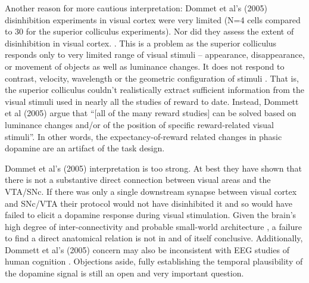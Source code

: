 {    Another reason for more cautious interpretation: Dommet et al's (2005) disinhibition experiments in visual cortex were very limited (N=4 cells compared to 30 for the superior colliculus experiments).  Nor did they assess the extent of disinhibition in visual cortex.
}. This is a problem as the superior colliculus responds only to very limited range of visual stimuli -- appearance, disappearance, or movement of objects as well as luminance changes.  It does not respond to contrast, velocity, wavelength or the geometric configuration of stimuli \citep{Dommett:2005p7263}. That is, the superior colliculus couldn't realistically extract sufficient information from the visual stimuli used in nearly all the studies of reward to date.  Instead, Dommett et al (2005) argue that ``[all of the many reward studies] can be solved based on luminance changes and/or of the position of specific reward-related visual stimuli''.  In other words, the expectancy-of-reward related changes in phasic dopamine are an artifact of the task design.  

 Dommet et al's (2005) interpretation is too strong.  At best they have shown that there is not a substantive direct connection between visual areas and the VTA/SNc.  If there was only a single downstream synapse between visual cortex and SNc/VTA their protocol would not have disinhibited it and so would have failed to elicit a dopamine response during visual stimulation.   Given the brain's high degree of inter-connectivity and probable small-world architecture \citep{bassett:2006aa}, a failure to find a direct anatomical relation is not in and of itself conclusive.  Additionally, Dommett et al's (2005) concern may also be inconsistent with EEG studies of human cognition \citep{Hillyard:1983p9844}. Objections aside, fully establishing the temporal plausibility of the dopamine signal is still an open and very important question.

